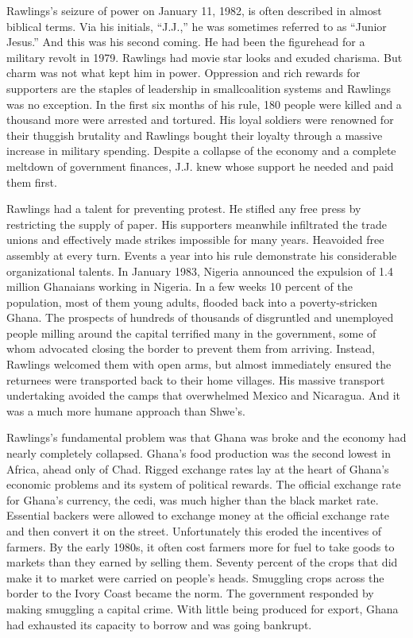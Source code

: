 \documentclass[10pt]{article}
\begin{document}
{\large Rawlings's seizure of power on January 11, 1982, is often described in
almost biblical terms. Via his initials, ``J.J.,'' he was sometimes referred to
as ``Junior Jesus.'' And this was his second coming. He had been the figurehead
for a military revolt in 1979. Rawlings had movie star looks and exuded charisma.
But charm was not what kept him in power. Oppression and rich rewards for
supporters are the staples of leadership in smallcoalition systems and Rawlings
was no exception. In the first six months of his rule, 180 people were killed and
a thousand more were arrested and tortured. His loyal soldiers were renowned for
their thuggish brutality and Rawlings bought their loyalty through a massive
increase in military spending. Despite a collapse of the economy and a complete
meltdown of government finances, J.J. knew whose support he needed and paid them
first.}

{\large Rawlings had a talent for preventing protest. He stifled any free press
by restricting the supply of paper. His supporters meanwhile infiltrated the
trade unions and effectively made strikes impossible for many years. Heavoided
free assembly at every turn. Events a year into his rule demonstrate his
considerable organizational talents. In January 1983, Nigeria announced the
expulsion of 1.4 million Ghanaians working in Nigeria. In a few weeks 10 percent
of the population, most of them young adults, flooded back into a
poverty-stricken Ghana. The prospects of hundreds of thousands of disgruntled and
unemployed people milling around the capital terrified many in the government,
some of whom advocated closing the border to prevent them from arriving. Instead,
Rawlings welcomed them with open arms, but almost immediately ensured the
returnees were transported back to their home villages. His massive transport
undertaking avoided the camps that overwhelmed Mexico and Nicaragua. And it was a
much more humane approach than Shwe's.}

{\large Rawlings's fundamental problem was that Ghana was broke and the economy
had nearly completely collapsed. Ghana's food production was the second lowest in
Africa, ahead only of Chad. Rigged exchange rates lay at the heart of Ghana's
economic problems and its system of political rewards. The official exchange rate
for Ghana's currency, the cedi, was much higher than the black market rate.
Essential backers were allowed to exchange money at the official exchange rate
and then convert it on the street. Unfortunately this eroded the incentives of
farmers. By the early 1980s, it often cost farmers more for fuel to take goods to
markets than they earned by selling them. Seventy percent of the crops that did
make it to market were carried on people's heads. Smuggling crops across the
border to the Ivory Coast became the norm. The government responded by making
smuggling a capital crime. With little being produced for export, Ghana had
exhausted its capacity to borrow and was going bankrupt.}
\end{document}
